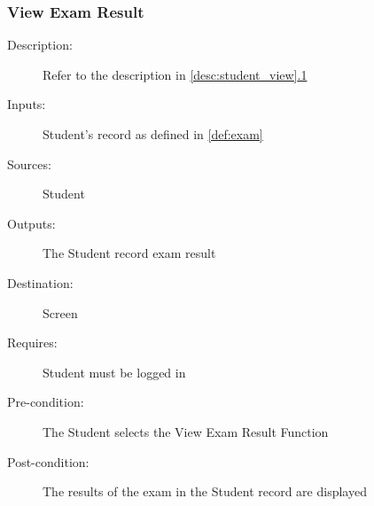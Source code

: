 \subsubsection{\large View Exam Result} 
\begin{boxed} %
\begin{description}
\item[Description:]
   Refer to the description in \autoref{desc:student_view}\hyperref[desc:student_view]{.1}
\item[Inputs:]
   Student's record as defined in \autoref{def:exam}
\item[Sources:]
   Student
\item[Outputs:]
   The Student record exam result
\item[Destination:]
   Screen
\item[Requires:]
   Student must be logged in
\item[Pre-condition:]
   The Student selects the View Exam Result Function
\item[Post-condition:]
   The results of the exam in the Student record are displayed
\end{description}
\end{boxed} %
